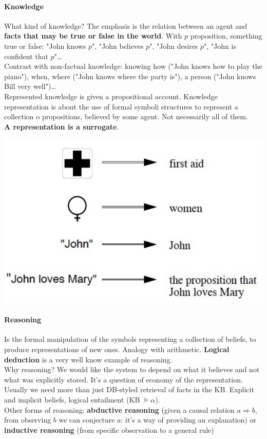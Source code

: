 \documentclass[10pt]{report}
\begin{document}
\paragraph{Knowledge} What kind of knowledge? The emphasis is the relation between an agent and \textbf{facts that may be true or false in the world}. With $p$ proposition, something true or false: "John knows $p$", "John believes $p$", "John desires $p$", "John is confident that $p$"\ldots\\
Contrast with non-factual knowledge: knowing how ("John knows how to play the piano"), when, where ("John knows where the party is"), a person ("John knows Bill very well")\ldots\\
Represented knowledge is given a propositional account. Knowledge representation is about the use of formal symboli structures to represent a collection o propositions, believed by some agent. Not necessarily all of them.\\
\textbf{A representation is a surrogate}.
\begin{center}
	\includegraphics[scale=0.5]{11.png}
\end{center}
\paragraph{Reasoning} Is the formal manipulation of the symbols representing a collection of beliefs, to produce representations of new ones. Analogy with arithmetic. \textbf{Logical deduction} is a very well know example of reasoning.\\
Why reasoning? We would like the system to depend on what it believes and not what was explicitly stored. It's a question of economy of the representation.\\
Usually we need more than just DB-styled retrieval of facts in the KB. Explicit and implicit beliefs, logical entailment (KB $\vDash \alpha$).\\
Other forms of reasoning: \textbf{abductive reasoning} (given a causal relation $a\Rightarrow b$, from observing $b$ we can conjecture $a$: it's a way of providing an explanation) or \textbf{inductive reasoning} (from specific observation to a general rule)
\end{document}
